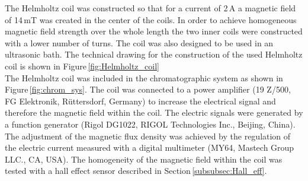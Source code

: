 The Helmholtz coil was constructed so that for a current of 2\,A a magnetic field of 14\,mT was created in the center of the coils. In order to achieve homogeneous magnetic field strength over the whole length the two inner coils were constructed with a lower number of turns. The coil was also designed to be used in an ultrasonic bath. The technical drawing for the construction of the used Helmholtz coil is shown in Figure\,\ref{fig:Helmholtz_coil}\\  
The Helmholtz coil was included in the chromatographic system as shown in Figure\,\ref{fig:chrom_sys}. The coil was connected to a power amplifier (19 Z/500, FG Elektronik, Rüttersdorf, Germany) to increase the electrical signal and therefore the magnetic field within the coil. The electric signals were generated by a function generator (Rigol DG1022, RIGOL Technologies Inc., Beijing, China). The adjustment of the magnetic flux density was achieved by the regulation of the electric current measured with a digital multimeter (MY64, Mastech Group LLC., CA, USA). The homogeneity of the magnetic field within the coil was tested with a hall effect sensor described in Section\,\ref{subsubsec:Hall_eff}.    

